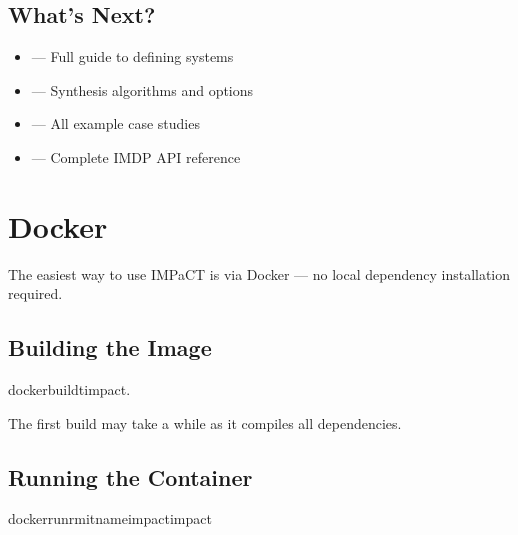 \documentclass[a4paper,10pt,english]{sphinxmanual}
\begin{document}
\subsection{What’s Next?}
\label{\detokenize{getting-started/quickstart:what-s-next}}\begin{itemize}
\item {} 
\sphinxAtStartPar
{\hyperref[\detokenize{user-guide/configuration::doc}]{}} — Full guide to defining systems

\item {} 
\sphinxAtStartPar
{\hyperref[\detokenize{user-guide/synthesis::doc}]{}} — Synthesis algorithms and options

\item {} 
\sphinxAtStartPar
{\hyperref[\detokenize{examples/index::doc}]{}} — All example case studies

\item {} 
\sphinxAtStartPar
{\hyperref[\detokenize{api/imdp::doc}]{}} — Complete IMDP API reference

\end{itemize}

\sphinxstepscope


\section{Docker}
\label{\detokenize{getting-started/docker:docker}}\label{\detokenize{getting-started/docker::doc}}
\sphinxAtStartPar
The easiest way to use IMPaCT is via Docker — no local dependency installation required.


\subsection{Building the Image}
\label{\detokenize{getting-started/docker:building-the-image}}
\begin{sphinxVerbatim}[commandchars=\\\{\}]
dockerbuild\PYGZhy{}timpact.
\end{sphinxVerbatim}

\sphinxAtStartPar
The first build may take a while as it compiles all dependencies.


\subsection{Running the Container}
\label{\detokenize{getting-started/docker:running-the-container}}
\begin{sphinxVerbatim}[commandchars=\\\{\}]
dockerrun\PYGZhy{}\PYGZhy{}rm\PYGZhy{}it\PYGZhy{}\PYGZhy{}nameimpactimpact
\end{sphinxVerbatim}
\end{document}
